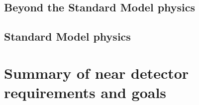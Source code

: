 \subsection{Beyond the Standard Model physics}
\label{ssec:exsum-nd-ndphys-bsm}

\subsection{Standard Model physics}
\label{sec:exsum-nd-ndphys-sm}

\section{Summary of near detector requirements and goals}
\label{sec:exsum-nd-requirements}
